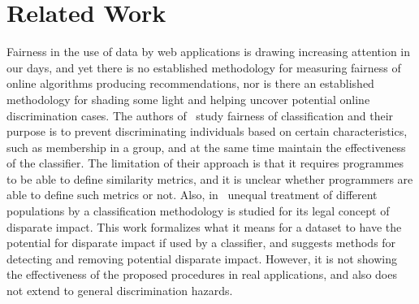 \section{Related Work}

Fairness in the use of data by web applications is drawing increasing
attention in our days, and yet there is no established methodology for
measuring fairness of online algorithms producing recommendations, nor is
there an established methodology for shading some light and helping
uncover potential online discrimination cases. The authors of~\cite{Fairness}
study fairness of classification and their purpose is to prevent
discriminating individuals based on certain characteristics, such as
membership in a group, and at the same time maintain the effectiveness of
the classifier. The limitation of their approach is that it requires
programmes to be able to define similarity metrics, and it is unclear
whether programmers are able to define such metrics or not. Also,
in~\cite{DisparateImpact} unequal treatment of different populations
by a classification methodology is studied for its legal concept of
disparate impact. This work formalizes what it means for a dataset to
have the potential for disparate impact if used by a classifier, and
suggests methods for detecting and removing potential disparate impact.
However, it is not showing the effectiveness of the proposed procedures
in real applications, and also does not extend to general discrimination
hazards.


